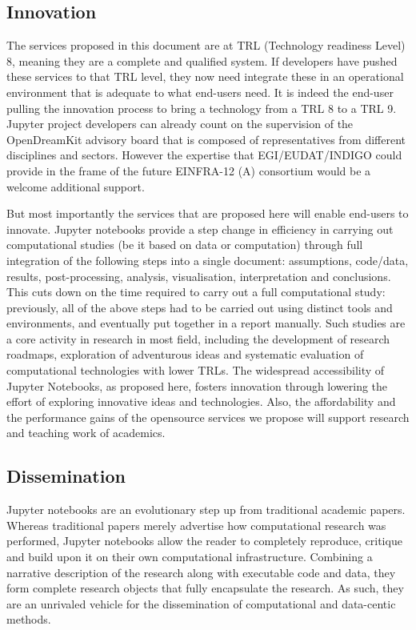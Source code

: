 \subsection{Innovation}

The services proposed in this document are at TRL (Technology readiness Level) 8, meaning they are a complete and qualified system. If developers have pushed these services to that TRL level, they now need integrate these in an operational environment that is adequate to what end-users need. It is indeed the end-user pulling the innovation process to bring a technology from a TRL 8 to a TRL 9.
Jupyter project developers can already count on the supervision of the OpenDreamKit advisory board that is composed of representatives from different disciplines and sectors. However the expertise that EGI/EUDAT/INDIGO could provide in the frame of the future EINFRA-12 (A) consortium would be a welcome additional support.

But most importantly the services that are proposed here will enable
end-users to innovate. Jupyter notebooks provide a step change in efficiency in carrying out
computational studies (be it based on data or computation) through
full integration of the following steps into a single document:
assumptions, code/data, results, post-processing, analysis,
visualisation, interpretation and conclusions. This cuts down on the
time required to carry out a full computational study: previously, all
of the above steps had to be carried out using distinct tools and
environments, and eventually put together in a report manually. Such
studies are a core activity in research in most field, including the
development of research roadmaps, exploration of adventurous ideas and
systematic evaluation of computational technologies with lower
TRLs.
The widespread accessibility of Jupyter Notebooks, as proposed
here, fosters innovation through lowering the effort of exploring
innovative ideas and technologies. Also, the affordability and the performance gains
of the opensource services we propose will support research and teaching
work of academics.


\subsection{Dissemination}

Jupyter notebooks are an evolutionary step up from traditional
academic papers.  Whereas traditional papers merely advertise how
computational research was performed, Jupyter notebooks allow the
reader to completely reproduce, critique and build upon it on their
own computational infrastructure.  Combining a narrative description
of the research along with executable code and data, they form
complete research objects that fully encapsulate the research. As
such, they are an unrivaled vehicle for the dissemination of
computational and data-centic methods.

